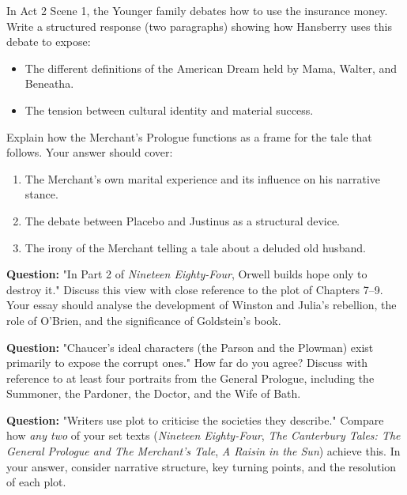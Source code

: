 \documentclass[11pt]{article}
\newcommand{\cle}[1]{{\popxbold\color{popdark}#1}}
\newcounter{popsec}
\newcounter{popsub}
\newcommand{\courssub}[1]{%
  \stepcounter{popsub}%
  \par\vspace{9pt}\noindent{\popxbold\fontsize{11.5}{13}\selectfont\color{popink}{\color{poporange}\thepopsec.\thepopsub}\hspace{6pt}#1}\par\nopagebreak\vspace{4pt}
}
\begin{document}
\begin{exercice}
In Act 2 Scene 1, the Younger family debates how to use the insurance money. Write a structured response (two paragraphs) showing how Hansberry uses this debate to expose:
\begin{itemize}
\item The different definitions of the \cle{American Dream} held by Mama, Walter, and Beneatha.
\item The tension between cultural identity and material success.
\end{itemize}
\end{exercice}

\begin{exercice}
Explain how the Merchant's Prologue functions as a frame for the tale that follows. Your answer should cover:
\begin{enumerate}
\item The Merchant's own marital experience and its influence on his narrative stance.
\item The debate between Placebo and Justinus as a structural device.
\item The irony of the Merchant telling a tale about a deluded old husband.
\end{enumerate}
\end{exercice}

\courssub{I prepare for the GCE}
\begin{exercice}
\textbf{Question:} "In Part 2 of \emph{Nineteen Eighty-Four}, Orwell builds hope only to destroy it." Discuss this view with close reference to the plot of Chapters 7–9. Your essay should analyse the development of Winston and Julia's rebellion, the role of O'Brien, and the significance of Goldstein's book.
\end{exercice}

\begin{exercice}
\textbf{Question:} "Chaucer's ideal characters (the Parson and the Plowman) exist primarily to expose the corrupt ones." How far do you agree? Discuss with reference to at least four portraits from the General Prologue, including the Summoner, the Pardoner, the Doctor, and the Wife of Bath.
\end{exercice}

\begin{exercice}
\textbf{Question:} "Writers use plot to criticise the societies they describe." Compare how \emph{any two} of your set texts (\emph{Nineteen Eighty-Four}, \emph{The Canterbury Tales: The General Prologue and The Merchant's Tale}, \emph{A Raisin in the Sun}) achieve this. In your answer, consider narrative structure, key turning points, and the resolution of each plot.
\end{exercice}
\end{document}
